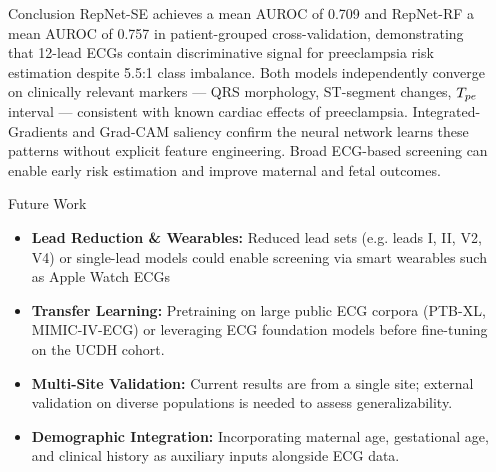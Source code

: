 \documentclass[final]{beamer}
\newlength{\sepwidth}
\newlength{\colwidth}
\newcommand{\separatorcolumn}{\begin{column}{\sepwidth}\end{column}}
\begin{document}
\begin{frame}[t]
\begin{columns}[t]
\begin{column}{\colwidth}
  \begin{block}{Conclusion}
    RepNet-SE achieves a mean AUROC of 0.709 and RepNet-RF a mean AUROC of 0.757 in patient-grouped cross-validation, demonstrating that 12-lead ECGs contain discriminative signal for preeclampsia risk estimation despite 5.5:1 class imbalance. Both models independently converge on clinically relevant markers --- QRS morphology, ST-segment changes, $\mathnormal{T_{pe}}$ interval --- consistent with known cardiac effects of preeclampsia. Integrated-Gradients and Grad-CAM saliency confirm the neural network learns these patterns without explicit feature engineering. Broad ECG-based screening can enable early risk estimation and improve maternal and fetal outcomes.
  \end{block}

  \begin{block}{Future Work}
    \begin{itemize}
      \item \textbf{Lead Reduction \& Wearables:} Reduced lead sets (e.g. leads I, II, V2, V4) or single-lead models could enable screening via smart wearables such as Apple Watch ECGs
      \item \textbf{Transfer Learning:} Pretraining on large public ECG corpora (PTB-XL, MIMIC-IV-ECG) or leveraging ECG foundation models before fine-tuning on the UCDH cohort.
      \item \textbf{Multi-Site Validation:} Current results are from a single site; external validation on diverse populations is needed to assess generalizability.
      \item \textbf{Demographic Integration:} Incorporating maternal age, gestational age, and clinical history as auxiliary inputs alongside ECG data.
    \end{itemize}
  \end{block}

\end{column}

\separatorcolumn
\end{columns}
\end{frame}
\end{document}
